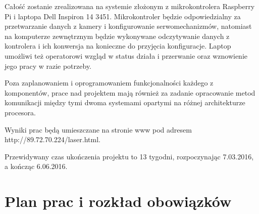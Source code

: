 \documentclass[a4paper, 11pt]{article}
\begin{document}
Całość zostanie zrealizowana na systemie złożonym z mikrokontrolera Raspberry Pi i laptopa Dell Inspiron 14 3451. Mikrokontroler będzie odpowiedzialny za przetwarzanie danych z kamery i konfigurowanie serwomechanizmów, natomiast na komputerze zewnętrznym będzie wykonywane odczytywanie danych z kontrolera i ich konwersja na konieczne do przyjęcia konfiguracje. Laptop umożliwi też operatorowi wzgląd w status działa i przerwanie oraz wznowienie jego pracy w razie potrzeby.

Poza zaplanowaniem i oprogramowaniem funkcjonalności każdego z komponentów, prace nad projektem mają również za zadanie opracowanie metod komunikacji między tymi dwoma systemami opartymi na różnej architekturze procesora.

Wyniki prac będą umieszczane na stronie www pod adresem \\ http://89.72.70.224/laser.html.

Przewidywany czas ukończenia projektu to 13 tygodni, rozpoczynając 7.03.2016, a kończąc 6.06.2016.

\section{Plan prac i rozkład obowiązków}

\end{document}
